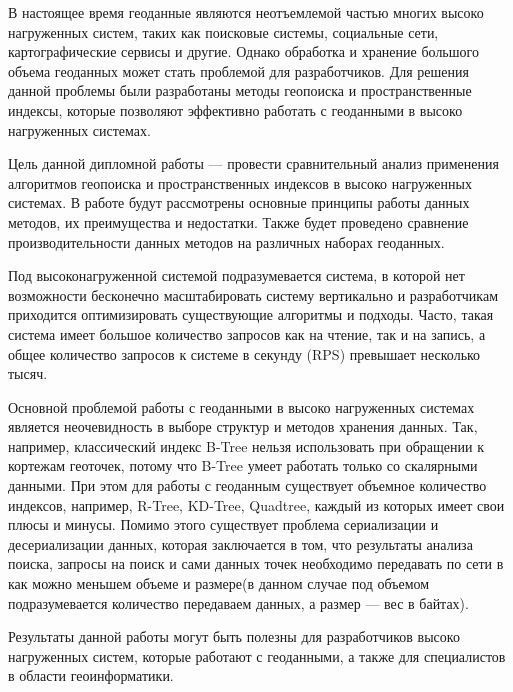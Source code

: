 \Introduction

В настоящее время геоданные являются неотъемлемой частью многих высоко нагруженных систем, таких как поисковые системы, социальные сети, картографические сервисы и другие. Однако обработка и хранение большого объема геоданных может стать проблемой для разработчиков. Для решения данной проблемы были разработаны методы геопоиска и пространственные индексы, которые позволяют эффективно работать с геоданными в высоко нагруженных системах.

Цель данной дипломной работы — провести сравнительный анализ применения алгоритмов геопоиска и пространственных индексов в высоко нагруженных системах. В работе будут рассмотрены основные принципы работы данных методов, их преимущества и недостатки. Также будет проведено сравнение производительности данных методов на различных наборах геоданных.

Под высоконагруженной системой подразумевается система, в которой нет возможности бесконечно масштабировать систему вертикально и разработчикам приходится оптимизировать существующие алгоритмы и подходы. Часто, такая система имеет большое количество запросов как на чтение, так и на запись, а общее количество запросов к системе в секунду (RPS) превышает несколько тысяч.

Основной проблемой работы с геоданными в высоко нагруженных системах является неочевидность в выборе структур и методов хранения данных. Так, например, классический индекс B-Tree нельзя использовать при обращении к кортежам геоточек, потому что B-Tree умеет работать только со скалярными данными. При этом для работы с геоданным существует объемное количество индексов, например, R-Tree, KD-Tree, Quadtree, каждый из которых имеет свои плюсы и минусы. Помимо этого существует проблема сериализации и десериализации данных, которая заключается в том, что результаты анализа поиска, запросы на поиск и сами данных точек необходимо передавать по сети в как можно меньшем объеме и размере(в данном случае под объемом подразумевается количество передаваем данных, а размер — вес в байтах).

Результаты данной работы могут быть полезны для разработчиков высоко нагруженных систем, которые работают с геоданными, а также для специалистов в области геоинформатики.

